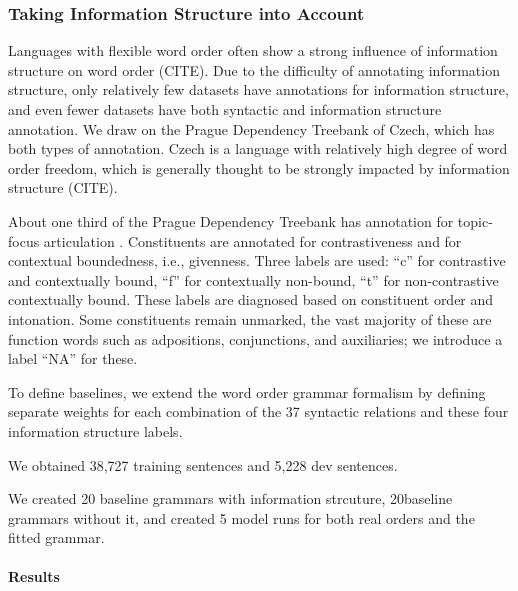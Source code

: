 
\subsubsection{Taking Information Structure into Account}\label{sec:czech}

Languages with flexible word order often show a strong influence of information structure on word order (CITE).
Due to the difficulty of annotating information structure, only relatively few datasets have annotations for information structure, and even fewer datasets have both syntactic and information structure annotation.
We draw on the Prague Dependency Treebank of Czech, which has both types of annotation.
Czech is a language with relatively high degree of word order freedom, which is generally thought to be strongly impacted by information structure (CITE).

About one third of the Prague Dependency Treebank has annotation for topic-focus articulation \citep{mikulova2006annotation}.
Constituents are annotated for contrastiveness and for contextual boundedness, i.e., givenness.
Three labels are used:
``c'' for contrastive and contextually bound, ``f'' for contextually non-bound, ``t'' for non-contrastive contextually bound.
These labels are diagnosed based on constituent order and intonation.
Some constituents remain unmarked, the vast majority of these are function words such as adpositions, conjunctions, and auxiliaries; we introduce a label ``NA'' for these.

To define baselines, we extend the word order grammar formalism by defining separate weights for each combination of the 37 syntactic relations and these four information structure labels.

We obtained 38,727 training sentences and 5,228 dev sentences.

We created 20 baseline grammars with information strcuture, 20baseline grammars without it, and created 5 model runs for both real orders and the fitted grammar.

\paragraph{Results}

